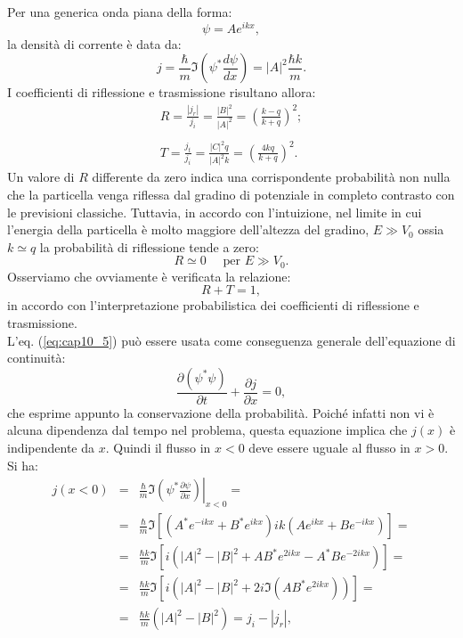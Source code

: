 \documentclass[a4paper,11pt,oneside]{book}
\begin{document}
Per una generica onda piana della forma:
\begin{equation}
\psi= Ae^{ikx},
\end{equation}
la densità di corrente è data da:
\begin{equation}
j=\frac{\hbar}{m}\Im \left(\psi ^* \frac{d\psi}{dx} \right)= |A|^2\frac{\hbar k}{m}.
\end{equation}
I coefficienti di riflessione e trasmissione risultano allora:
\begin{eqnarray}
R=\frac{|j_r|}{j_i}= \frac{|B|^2}{|A|^2}=\left(\frac{k-q}{k+q}\right)^2;\nonumber \\
\\
T=\frac{j_t}{j_i}= \frac{|C|^2 q}{|A|^2 k}=\left(\frac{4kq}{k+q}\right)^2.\nonumber 
\end{eqnarray}
Un valore di $R$ differente da zero indica una corrispondente probabilità non nulla che la particella venga riflessa dal gradino di potenziale in completo contrasto con le previsioni classiche. Tuttavia, in accordo con l'intuizione, nel limite in cui l'energia della particella è molto maggiore dell'altezza del gradino, $E\gg V_0$ ossia $k\simeq q$ la probabilità di riflessione tende a zero:
\begin{equation}
R\simeq 0\quad  \textrm{ per } E\gg V_0.
\end{equation}
Osserviamo che ovviamente è verificata la relazione:
\begin{equation}
R+T=1,
\label{eq:cap10_5}
\end{equation}
in accordo con l'interpretazione probabilistica dei coefficienti di riflessione e trasmissione.\\
L'eq. (\ref{eq:cap10_5}) può essere usata come conseguenza generale dell'equazione di continuità:
\begin{equation}
\frac{\partial \left(\psi^* \psi \right)}{\partial t}+ \frac{\partial j}{\partial x}=0,
\end{equation}
che esprime appunto la conservazione della probabilità. Poiché infatti non vi è alcuna dipendenza dal tempo nel problema, questa equazione implica che $j(x)$ è indipendente da $x$. Quindi il flusso in $x<0$ deve essere uguale al flusso in $x>0$. Si ha:
\begin{eqnarray}
j\left( x<0 \right) &=& \frac{\hbar}{m} \Im \left. \left( \psi ^* \frac{\partial \psi}{\partial x} \right) \right| _{x<0} = \nonumber \\
&=& \frac{\hbar}{m} \Im \left[ \left( A^* e^{-ikx} + B^* e^{ikx}\right)ik \left( A e^{ikx} + B e^{-ikx}\right)\right]= \nonumber \\
&=&\frac{\hbar k}{m} \Im \left[ i\left( |A|^2 - |B|^2 +AB^* e^{2ikx}- A^* B e^{-2ikx}\right)\right]= \nonumber \\
&=&\frac{\hbar k}{m} \Im \left[ i\left( |A|^2 - |B|^2 +2i \Im \left( A B^* e^{2ikx}\right) \right)\right]= \nonumber \\
&=& \frac{\hbar k}{m}\left( |A|^2 - |B|^2\right)= j_i- |j_r|,
\end{eqnarray}
\end{document}

